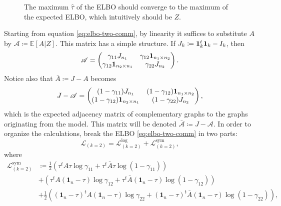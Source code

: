 \documentclass[../../main.tex]{subfiles} %
\begin{document}
\begin{figure}[ht]
	\centering
	
	\caption{The maximum \(\hat \tau\) of the ELBO should converge to the 
		maximum of the 
		expected ELBO, which intuitively should be \(Z\).}
	\label{fig:convergence_tau_z}
\end{figure}

Starting from equation \ref{eq:elbo-two-comm}, by linearity it suffices to 
substitute \(A\) by \(\mathscr A \coloneqq \mathbb E \left[A \vert Z\right]\). 
This matrix has a simple structure. If \(J_k \coloneqq \ones[k]^t \ones[k] - 
I_k\), then 
\begin{dmath*}
	\mathscr A = 
	\begin{pmatrix}
		\gamma_{11} J_{n_1} & \gamma_{12} \ones[n_1 \times n_2] \\
		\gamma_{12} \ones[n_2 \times n_1] & \gamma_{22} J_{n_2}
	\end{pmatrix}.
\end{dmath*}
Notice also that \(\bar A \coloneqq J - A\) becomes 
\begin{dmath*}
	J - \mathscr A = 
	\begin{pmatrix}
		(1 - \gamma_{11}) J_{n_1} &  (1-\gamma_{12}) \ones[n_1 \times n_2] \\
		(1-\gamma_{12}) \ones[n_2 \times n_1] & (1-\gamma_{22}) J_{n_2}
	\end{pmatrix},
\end{dmath*}
which is the expected adjacency matrix of complementary graphs to the graphs 
originating from the model. This matrix will be denoted \(\bar{\mathscr{A}} 
\coloneqq  J - \mathscr{A}\). In order to organize the calculations, break the 
ELBO \ref{eq:elbo-two-comm} in two parts:
\begin{equation}
	\mathcal L_{(k=2)} = \mathcal L_{(k=2)}^{\text{log}} + \mathcal 
	L_{(k=2)}^{\text{sym}},
\end{equation}
where
\begin{align*}
	\mathcal L_{(k=2)}^{\text{sym}} &\coloneqq
	\frac{1}{2} \left( \tau^t A \tau 
	\log{\gamma_{11}} + \tau^t
	\bar A \tau \log{\left( 1 - \gamma_{11} \right)} \right) \\
	&+ \left( \tau^t A \left( \mathbf{1}_n - \tau \right) \log{\gamma_{12}} 
	+ \tau^t \bar A \left( \mathbf{1}_n - \tau \right) 
	\log{\left( 1 - \gamma_{12} \right)} \right) \\
	&+ \frac{1}{2} \left( \left( \mathbf{1}_n - \tau \right)^t A \left(
	\mathbf{1}_n - \tau \right) \log{\gamma_{22}} + \left( \mathbf{1}_n - 
	\tau \right)^t \bar A \left( \mathbf{1}_n - \tau \right) 
	\log{\left( 1 - \gamma_{22} \right)} \right),
\end{align*}
\end{document}
